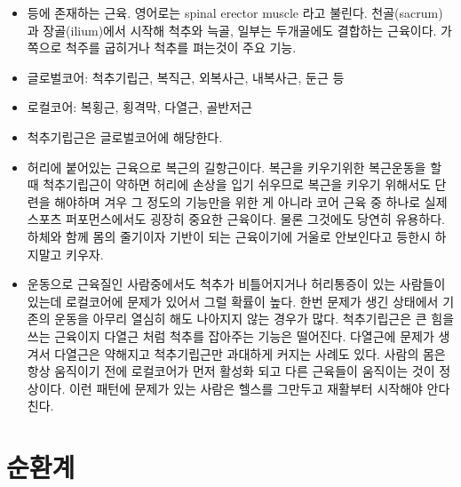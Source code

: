 \documentclass[12pt, a4paper, oneside]{book}
\let\stdsection\section
\renewcommand\section{\newpage\stdsection}
\begin{document}
			\begin{itemize}		[
							topsep=0.0em, 
							parsep=0.0em, 
							itemsep=0em, 
							leftmargin=6.0em, 
							labelwidth=3em, 
							labelsep=3em
							] 
			\item 등에 존재하는 근육. 영어로는 spinal erector muscle 라고 불린다. 천골(sacrum)과 장골(ilium)에서 시작해 척추와 늑골, 일부는 두개골에도 결합하는 근육이다. 가쪽으로 척주를 굽히거나 척추를 펴는것이 주요 기능.

			\item 글로벌코어: 척추기립근, 복직근, 외복사근, 내복사근, 둔근 등
			\item 로컬코어: 복횡근, 횡격막, 다열근, 골반저근

			\item 척추기립근은 글로벌코어에 해당한다. 
			\item 허리에 붙어있는 근육으로 복근의 길항근이다. 복근을 키우기위한 복근운동을 할 때 척추기립근이 약하면 허리에 손상을 입기 쉬우므로 복근을 키우기 위해서도 단련을 해야하며 겨우 그 정도의 기능만을 위한 게 아니라 코어 근육 중 하나로 실제 스포츠 퍼포먼스에서도 굉장히 중요한 근육이다. 물론 그것에도 당연히 유용하다. 하체와 함께 몸의 줄기이자 기반이 되는 근육이기에 거울로 안보인다고 등한시 하지말고 키우자.

			\item 운동으로 근육질인 사람중에서도 척추가 비틀어지거나 허리통증이 있는 사람들이 있는데 로컬코어에 문제가 있어서 그럴 확률이 높다. 한번 문제가 생긴 상태에서 기존의 운동을 아무리 열심히 해도 나아지지 않는 경우가 많다. 척추기립근은 큰 힘을 쓰는 근육이지 다열근 처럼 척추를 잡아주는 기능은 떨어진다. 다열근에 문제가 생겨서 다열근은 약해지고 척추기립근만 과대하게 커지는 사례도 있다. 사람의 몸은 항상 움직이기 전에 로컬코어가 먼저 활성화 되고 다른 근육들이 움직이는 것이 정상이다. 이런 패턴에 문제가 있는 사람은 헬스를 그만두고 재활부터 시작해야 안다친다.
			\end{itemize}






%
%
%
\newpage
\section{순환계}



%
%
%
\newpage
\end{document}
